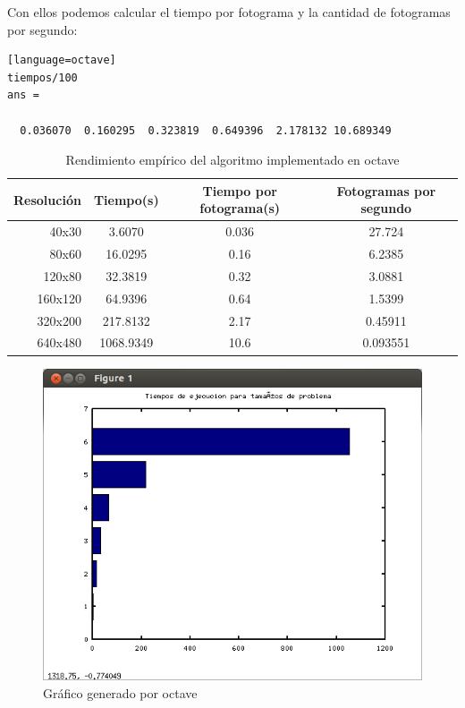 \documentclass[a4,12pt]{article}
\begin{document}
Con ellos podemos calcular el tiempo por fotograma y la cantidad de fotogramas por segundo:\\

\begin{lstlisting}[frame=single][language=octave]
tiempos/100
ans =

  0.036070  0.160295  0.323819  0.649396  2.178132 10.689349
\end{lstlisting}
\begin{table}[h!]
\centering
\begin{tabular}{ | r | c | c | c | }
\hline
  Resolución & Tiempo(s) & Tiempo por fotograma(s) & Fotogramas por segundo\\
\hline
  40x30 & 3.6070 & 0.036 &  27.724 \\
  80x60 & 16.0295 & 0.16 & 6.2385 \\
  120x80 & 32.3819 & 0.32 & 3.0881 \\
  160x120 & 64.9396 & 0.64 & 1.5399 \\
  320x200 & 217.8132 & 2.17 & 0.45911 \\
  640x480 & 1068.9349 & 10.6 & 0.093551 \\
\hline
\end{tabular}
\caption{Rendimiento empírico del algoritmo implementado en octave}
\end{table}



\begin{figure}[h!]
  \centering
    \includegraphics[scale=0.66]{img/octave}
  \caption{Gráfico generado por octave}
\end{figure}
\end{document}
